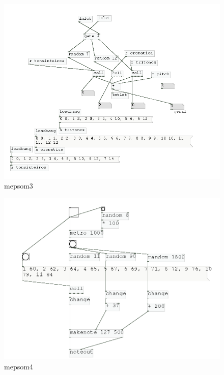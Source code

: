 \documentclass{ppgmus}
\begin{document}
\begin{figure}
\includegraphics[scale=.4]{mepsom3}
\caption{mepsom3}
\label{mepsom3}
\end{figure}


\begin{figure}
\includegraphics[scale=.4]{mepsom4}
\caption{mepsom4}
\label{mepsom4}
\end{figure}
\end{document}
